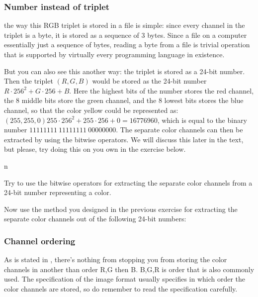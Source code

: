 \subsubsection{Number instead of triplet}

the way this RGB triplet is stored in a file is simple: since every
channel in the triplet is a byte, it is stored as a sequence of 3
bytes. Since a file on a computer essentially just a sequence of
bytes, reading a byte from a file is trivial operation that is
supported by virtually every programming language in existence.

But you can also see this another way: the triplet is stored as a
24-bit number. Then the triplet $(R,G,B)$ would be stored as the
24-bit number $R \cdot 256^2 + G \cdot 256 + B$. Here the highest bits
of the number stores the red channel, the 8 middle bits store the
green channel, and the 8 lowest bits stores the blue channel, so that
the color yellow could be represented as: $(255,255,0) 255 \cdot 256^2
+ 255 \cdot 256 + 0 = 16776960$, which is equal to the binary number
$11111111\ 11111111\ 00000000$. The separate color channels can then
be extracted by using the bitwise operators. We will discuss this
later in the text, but please, try doing this on you own in the
exercise below.

n\begin{Exercise}
  Try to use the bitwise operators for extracting the separate color
  channels from a 24-bit number representing a color.

\end{Exercise}

\begin{Exercise}

  Now use the method you designed in the previous exercise for
  extracting the separate color channels out of the following 24-bit
  numbers:

\end{Exercise}

\subsubsection{Channel ordering}

As is stated in \cite{murray1996encyclopedia}, there's nothing from
stopping you from storing the color channels in another than order R,G then
B. B,G,R is order that is also commonly used. The specification of the
image format usually specifies in which order the color channels are
stored, so do remember to read the specification carefully.

